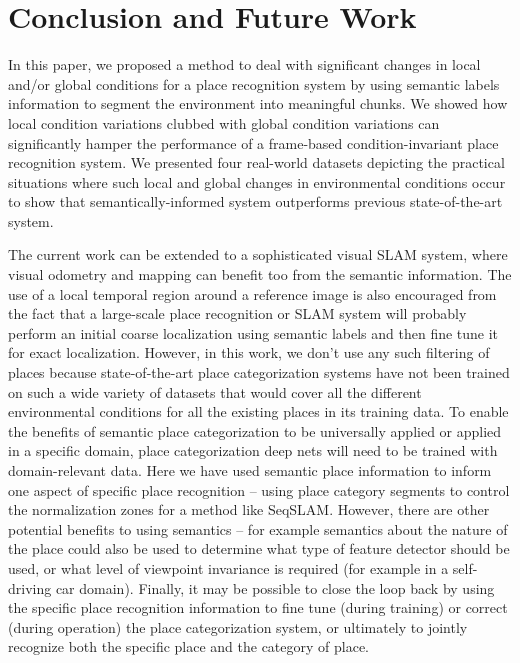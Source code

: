 \documentclass[letterpaper, 10 pt, conference]{ieeeconf}  %
\begin{document}
\section{Conclusion and Future Work}
In this paper, we proposed a method to deal with significant changes in local and/or global conditions for a place recognition system by using semantic labels information to segment the environment into meaningful chunks. We showed how local condition variations clubbed with global condition variations can significantly hamper the performance of a frame-based condition-invariant place recognition system. We presented four real-world datasets depicting the practical situations where such local and global changes in environmental conditions occur to show that semantically-informed system outperforms previous state-of-the-art system.

The current work can be extended to a sophisticated visual SLAM system, where visual odometry and mapping can benefit too from the semantic information. The use of a local temporal region around a reference image is also encouraged from the fact that a large-scale place recognition or SLAM system will probably perform an initial coarse localization using semantic labels and then fine tune it for exact localization. However, in this work, we don't use any such filtering of places because state-of-the-art place categorization systems have not been trained on such a wide variety of datasets that would cover all the different environmental conditions for all the existing places in its training data.
To enable the benefits of semantic place categorization to be universally applied or applied in a specific domain, place categorization deep nets will need to be trained with domain-relevant data.
Here we have used semantic place information to inform one aspect of specific place recognition – using place category segments to control the normalization zones for a method like SeqSLAM. However, there are other potential benefits to using semantics – for example semantics about the nature of the place could also be used to determine what type of feature detector should be used, or what level of viewpoint invariance is required (for example in a self-driving car domain). Finally, it may be possible to close the loop back by using the specific place recognition information to fine tune (during training) or correct (during operation) the place categorization system, or ultimately to jointly recognize both the specific place and the category of place.

\end{document}
